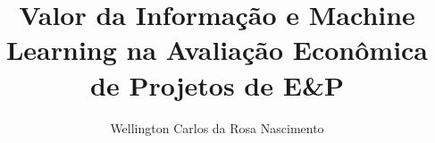 \documentclass[
  phd,
  brazilian
]{ThesisPUC}
\author{Wellington Carlos da Rosa Nascimento}
\title{Valor da Informação e Machine Learning na Avaliação Econômica de Projetos de E\&P}
\begin{document}
\listofalgorithms  %
  
  
  \arial
  
  \normalfont
\end{document}
